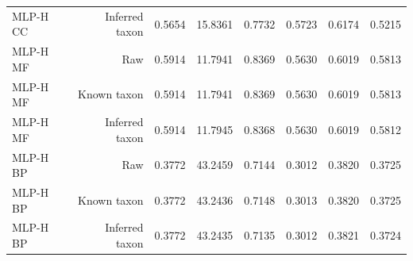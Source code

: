\begin{longtable}{lrrrrrrr}
MLP-H CC & Inferred taxon & 0.5654 & 15.8361 & 0.7732 & 0.5723 & 0.6174 & 0.5215 \\
MLP-H MF & Raw & 0.5914 & 11.7941 & 0.8369 & 0.5630 & 0.6019 & 0.5813 \\
MLP-H MF & Known taxon & 0.5914 & 11.7941 & 0.8369 & 0.5630 & 0.6019 & 0.5813 \\
MLP-H MF & Inferred taxon & 0.5914 & 11.7945 & 0.8368 & 0.5630 & 0.6019 & 0.5812 \\
MLP-H BP & Raw & 0.3772 & 43.2459 & 0.7144 & 0.3012 & 0.3820 & 0.3725 \\
MLP-H BP & Known taxon & 0.3772 & 43.2436 & 0.7148 & 0.3013 & 0.3820 & 0.3725 \\
MLP-H BP & Inferred taxon & 0.3772 & 43.2435 & 0.7135 & 0.3012 & 0.3821 & 0.3724 \\
\bottomrule
\end{longtable}
\endgroup
